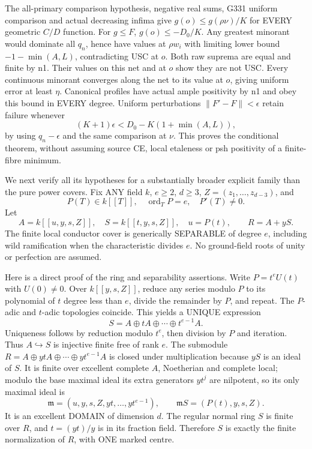 The all-primary comparison hypothesis, negative real sums, G331 uniform
comparison and actual decreasing infima give
$g(o)\le g(\rho\nu)/K$ for EVERY geometric $C/D$ function.
For $g\le F$, $g(o)\le-D_0/K$.
Any greatest minorant would dominate all $q_n$, hence have values at
$\rho w_i$ with limiting lower bound $-1-\min(A,L)$, contradicting USC
at $o$. Both raw suprema are equal and finite by n1. Their values on this
net and at $o$ show they are not USC. Every continuous minorant converges
along the net to its value at $o$, giving uniform error at least $\eta$.
Canonical profiles have actual ample positivity by n1 and obey this bound
in EVERY degree. Uniform perturbations $\|F'-F\|<\epsilon$ retain failure
whenever
\[
 (K+1)\epsilon<D_0-K(1+\min(A,L)),
\]
by using $q_n-\epsilon$ and the same comparison at $\nu$.
This proves the conditional theorem, without assuming source CE, local
etaleness or psh positivity of a finite-fibre minimum.

We next verify all its hypotheses for a substantially broader explicit
family than the pure power covers. Fix ANY field $k$, $e\ge2$, $d\ge3$,
$Z=(z_1,\ldots,z_{d-3})$, and
\[
 P(T)\in k[[T]],\quad \operatorname{ord}_T P=e,
 \quad P'(T)\ne0.
\]
Let
\[
 A=k[[u,y,s,Z]],\quad S=k[[t,y,s,Z]],\quad u=P(t),
 \qquad R=A+yS.
\]
The finite local conductor cover is generically SEPARABLE of degree $e$,
including wild ramification when the characteristic divides $e$.
No ground-field roots of unity or perfection are assumed.

Here is a direct proof of the ring and separability assertions. Write
$P=t^eU(t)$ with $U(0)\ne0$. Over $k[[y,s,Z]]$, reduce any series modulo
$P$ to its polynomial of $t$ degree less than $e$, divide the remainder
by $P$, and repeat. The $P$-adic and $t$-adic topologies coincide.
This yields a UNIQUE expression
\[
 S=A\oplus tA\oplus\cdots\oplus t^{e-1}A.
\]
Uniqueness follows by reduction modulo $t^e$, then division by $P$ and
iteration. Thus $A\hookrightarrow S$ is injective finite free of rank $e$.
The submodule $R=A\oplus ytA\oplus\cdots\oplus yt^{e-1}A$ is closed
under multiplication because $yS$ is an ideal of $S$. It is finite over
excellent complete $A$, Noetherian and complete local; modulo the base
maximal ideal its extra generators $yt^j$ are nilpotent, so its only
maximal ideal is
\[
 \mathfrak m=(u,y,s,Z,yt,\ldots,yt^{e-1}),\qquad
 \mathfrak mS=(P(t),y,s,Z).
\]
It is an excellent DOMAIN of dimension $d$. The regular normal ring $S$
is finite over $R$, and $t=(yt)/y$ is in its fraction field. Therefore
$S$ is exactly the finite normalization of $R$, with ONE marked centre.


